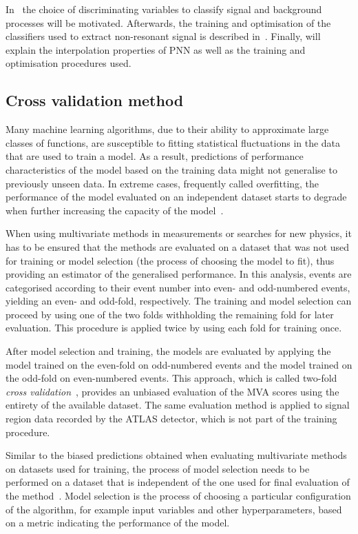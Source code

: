 In~ the choice of
discriminating variables to classify signal and background processes
will be motivated. Afterwards, the training and optimisation of the
classifiers used to extract non-resonant signal is described
in~. Finally,  will explain the
interpolation properties of PNN as well as the training and
optimisation procedures used. 


\subsection{Cross validation method}
\label{sec:mva_crossvalidation}

Many machine learning algorithms, due to their ability to approximate
large classes of functions, are susceptible to fitting statistical
fluctuations in the data that are used to train a model. As a result,
predictions of performance characteristics of the model based on the
training data might not generalise to previously unseen data. In
extreme cases, frequently called overfitting, the performance of the
model evaluated on an independent dataset starts to degrade when
further increasing the capacity of the model~\cite{hastie09}.

When using multivariate methods in measurements or searches for new
physics, it has to be ensured that the methods are evaluated on a
dataset that was not used for training or model selection (the process
of choosing the model to fit), thus providing an estimator of the
generalised performance. In this analysis, events are categorised
according to their event number into even- and odd-numbered events,
yielding an even- and odd-fold, respectively. The training and model
selection can proceed by using one of the two folds withholding the
remaining fold for later evaluation. This procedure is applied twice
by using each fold for training once.

After model selection and training, the models are evaluated by
applying the model trained on the even-fold on odd-numbered events and
the model trained on the odd-fold on even-numbered events. This
approach, which is called two-fold \emph{cross
  validation}~\cite{hastie09,bishop06}, provides an unbiased
evaluation of the MVA scores using the entirety of the available
dataset. The same evaluation method is applied to signal region data
recorded by the ATLAS detector, which is not part of the training
procedure.

Similar to the biased predictions obtained when evaluating
multivariate methods on datasets used for training, the process of
model selection needs to be performed on a dataset that is independent
of the one used for final evaluation of the
method~\cite{cawley10}. Model selection is the process of choosing a
particular configuration of the algorithm, for example input variables
and other hyperparameters, based on a metric indicating the
performance of the model.

